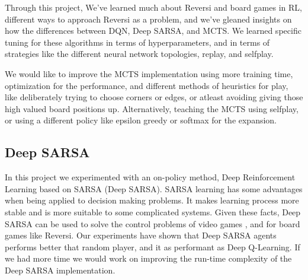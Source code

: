 Through this project, We've learned much about Reversi and board games in RL, different ways to approach Reversi as a problem, and we've gleaned insights on how the differences between DQN, Deep SARSA, and MCTS. We learned specific tuning for these algorithms in terms of hyperparameters, and in terms of strategies like the different neural network topologies, replay, and selfplay.

We would like to improve the MCTS implementation using more training time, optimization for the performance, and different methods of heuristics for play, like deliberately trying to choose corners or edges, or atleast avoiding giving those high valued board positions up. Alternatively, teaching the MCTS using selfplay, or using a different policy like epsilon greedy or softmax for the expansion.
\subsection{Deep SARSA}
In this project we experimented with an on-policy method, Deep Reinforcement Learning based on SARSA (Deep SARSA). SARSA learning has some advantages when being applied to decision making problems. It makes learning process more stable and is more suitable to some complicated systems. Given these facts,  Deep SARSA can be used to solve the control problems of video games \cite{7849837} , and for board games like Reversi. Our experiments have shown that Deep SARSA agents performs better that random player, and it as performant as Deep Q-Learning. If we had more time we would work on improving the run-time complexity of the Deep SARSA implementation.
